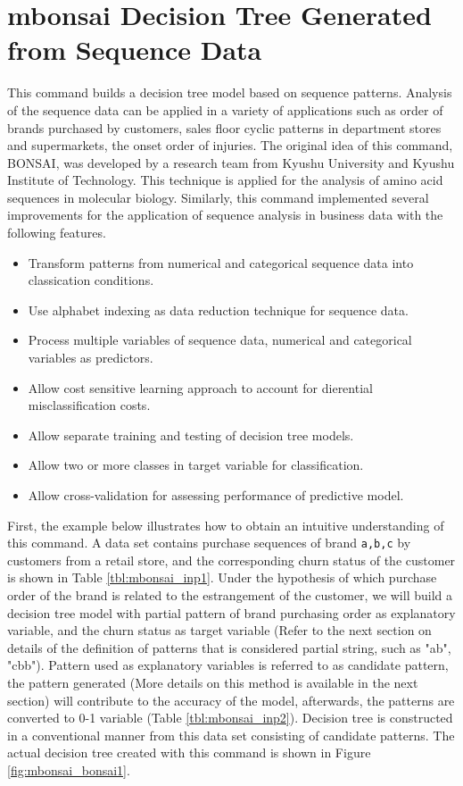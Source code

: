 

%


\section{mbonsai Decision Tree Generated from Sequence Data \label{sect:mbonsai}}
This command builds a decision tree model based on sequence patterns. Analysis of the sequence data can be applied in a variety of applications such as order of brands purchased by customers, sales floor cyclic patterns in department stores and supermarkets, the onset order of injuries.  The original idea of this command, BONSAI\cite{SSS94}, was developed by a research team from Kyushu University and Kyushu Institute of Technology. This technique is applied for the analysis of amino acid sequences in molecular biology. Similarly, this command implemented several improvements for the application of sequence analysis in business data with the following features.

\begin{itemize}
 \item Transform patterns from numerical and categorical sequence data into classication conditions.
 \item Use alphabet indexing as data reduction technique for sequence data.
 \item Process multiple variables of sequence data, numerical and categorical variables as predictors.
 \item Allow cost sensitive learning approach to account for dierential misclassification costs.
 \item Allow separate training and testing of decision tree models.
 \item Allow two or more classes in target variable for classification.
 \item Allow cross-validation for assessing performance of predictive model.
\end{itemize}

First, the example below illustrates how to obtain an intuitive understanding of this command. A data set contains purchase sequences of brand \verb|a,b,c| by customers from a retail  store, and the corresponding churn status of the customer is shown in Table \ref{tbl:mbonsai_inp1}. Under the hypothesis of which purchase order of the brand is related to the estrangement of the customer, we will build a decision tree model with partial pattern of brand purchasing order as explanatory variable, and the churn status as target variable (Refer to the next section on details of the definition of patterns that is considered partial string, such as "ab", "cbb").  Pattern used as explanatory variables is referred to as candidate pattern, the pattern generated (More details on this method is available in the next section) will contribute to the accuracy of the model, afterwards, the patterns are converted to 0-1 variable (Table \ref{tbl:mbonsai_inp2}). Decision tree is constructed in a conventional manner from this data set consisting of candidate patterns. The actual decision tree created with this command is shown in Figure \ref{fig:mbonsai_bonsai1}.

